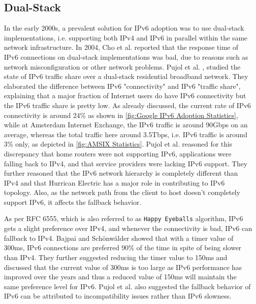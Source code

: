 \subsection*{Dual-Stack}

In the early 2000s, a prevalent solution for IPv6 adoption was to use dual-stack implementations, i.e. supporting both IPv4 and IPv6 in parallel within the same network infrastructure.
In 2004, Cho et al. \cite{dualcho} reported that the response time of IPv6 connections on dual-stack implementations was bad, due to reasons such as network misconfiguration or other network problems. Pujol et al. \cite{dualpujol}, studied the state of IPv6 traffic share over a dual-stack residential broadband network. They elaborated the difference between
IPv6 "connectivity" and IPv6 "traffic share", explaining that a major fraction of Internet users do have IPv6 connectivity but the IPv6 traffic share is pretty low. As already discussed,
the current rate of IPv6 connectivity is around 24\% as shown in \cref{fig:Google IPv6 Adoption Statistics}, while at Amsterdam Internet Exchange, the IPv6 traffic is around 90Gbps on
an average, whereas the total traffic here around 3.5Tbps, i.e. IPv6 traffic is around 3\% only, as depicted in \cref{fig:AMSIX Statistics}. Pujol et al. reasoned for this discrepancy that home routers were not supporting IPv6, applications were falling back to IPv4, and that service providers were lacking IPv6 support. They further reasoned that the IPv6 network
hierarchy is completely different than IPv4 and that Hurrican Electric has a major role in contributing to IPv6 topology. Also, as the network path from the client to host doesn't completely support IPv6, it affects the fallback behavior. 

As per RFC 6555, which is also referred to as \texttt{Happy Eyeballs} algorithm, IPv6 gets a slight preference over IPv4, and whenever the connectivity is bad, IPv6 can fallback to IPv4.
Bajpai and Schönwälder \cite{bajpaihappy} showed that with a timer value of 300ms, IPv6 connections are preferred 90\% of the time in spite of being slower than IPv4. They further suggested reducing
the timer value to 150ms and discussed that the current value of 300ms is too large as IPv6 performance has improved over the years and thus a reduced value of 150ms will maintain the same preference level for IPv6.
Pujol et al. \cite{dualpujol} also suggested the fallback behavior of IPv6 can be attributed to incompatibility issues rather than IPv6 slowness.

